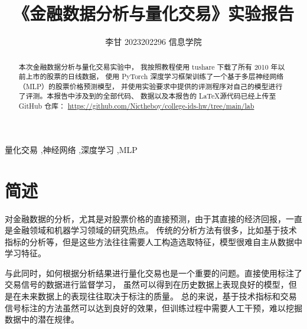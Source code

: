 \documentclass[final,5p,times,twocolumn,authoryear]{elsarticle}
\begin{document}
\begin{frontmatter}

       \title{《金融数据分析与量化交易》实验报告}

       \author[first]{李甘 2023202296 信息学院}

       \begin{abstract}
              本次金融数据分析与量化交易实验中，
              我按照教程使用 tushare 下载了所有 2010 年以前上市的股票的日线数据，
              使用 PyTorch 深度学习框架训练了一个基于多层神经网络（MLP）的股票价格预测模型，
              并使用实验要求中提供的评测程序对自己的模型进行了评测。本报告中涉及到的全部代码、
              数据以及本报告的 \LaTeX 源代码已经上传至 GitHub 仓库：
              \url{https://github.com/Nictheboy/college-ids-hw/tree/main/lab}
       \end{abstract}

       \begin{keyword}
              量化交易 \sep 神经网络 \sep 深度学习 \sep MLP



       \end{keyword}


\end{frontmatter}




\section{简述}
对金融数据的分析，尤其是对股票价格的直接预测，由于其直接的经济回报，一直是金融领域和机器学习领域的研究热点。
传统的分析方法有很多，比如基于技术指标的分析等，但是这些方法往往需要人工构造选取特征，模型很难自主从数据中学习特征。

与此同时，如何根据分析结果进行量化交易也是一个重要的问题。直接使用标注了交易信号的数据进行监督学习，
虽然可以得到在历史数据上表现良好的模型，但是在未来数据上的表现往往取决于标注的质量。
总的来说，基于技术指标和交易信号标注的方法虽然可以达到良好的效果，但训练过程中需要人工干预，难以挖掘数据中的潜在规律。
\end{document}
